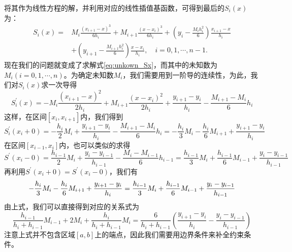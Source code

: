 	将其作为线性方程的解，并利用对应的线性插值基函数，可得到最后的$S_{i}(x)$为：
	\begin{equation}
		\begin{aligned}
			S_{i}(x)=& M_i \frac{\left(x_{i+1}-x\right)^3}{6 h_i}+M_{i+1} \frac{\left(x-x_i\right)^3}{6 h_i}+\left(y_i-\frac{M_i h_i^2}{6}\right) \frac{x_{i+1}-x}{h_i} \\
				 &+\left(y_{i+1}-\frac{M_{i+1} h_i^2}{6}\right) \frac{x-x_i}{h_i}, \quad i=0,1, \cdots, n-1 .
		\end{aligned}
		\label{eq:unkown_Sx}
	\end{equation} 
	现在我们的问题就变成了求解式\eqref{eq:unkown_Sx}，而其中的未知数为$M_i(i = 0, 1, \cdots, n)$。为确定未知数$M_i$，我们需要用到一阶导的连续性，为此，我们对$S_{i}(x)$求一次导得
	\begin{equation}
		S_{i}^{\prime}(x)=-M_i \frac{\left(x_{i+1}-x\right)^2}{2 h_i}+M_{i+1} \frac{\left(x-x_i\right)^2}{2 h_i}+\frac{y_{i+1}-y_i}{h_i}-\frac{M_{i+1}-M_i}{6} h_i	\label{eq:first_order_Sx}
	\end{equation}
	这样，在区间$[x_i, x_{i+1}]$内，我们得到
	\begin{equation*}
		S_{i}^{\prime}(x_i + 0) = - \frac{h_i}{2}M_i + \frac{y_{i+1} - y_i}{h_i} - \frac{M_{i+1} - M_{i}}{6}h_i = - \frac{h_i}{3}M_i - \frac{h_i}{6}M_{i+1} + \frac{y_{i+1} - y_i}{h_i}
	\end{equation*} 
	在区间$[x_{i-1}, x_i]$内，也可以类似的求得
	\begin{equation*}
		S^{\prime}(x_i - 0) = \frac{h_{i-1}}{2}M_{i} + \frac{y_{i} - y_{i-1}}{h_{i-1}} - \frac{M_{i} - M_{i-1}}{6}h_{i-1} = \frac{h_{i-1}}{3}M_i + \frac{h_{i-1}}{6}M_{i-1} + \frac{y_{i} - y_{i-1}}{h_{i-1}}
	\end{equation*} 
	再利用$S^{\prime}(x_i + 0) =S^{\prime}(x_i - 0)$，我们有
	\begin{equation*}
			- \frac{h_i}{3}M_i - \frac{h_i}{6}M_{i+1} + \frac{y_{i+1} - y_i}{h_i} = \frac{h_{i-1}}{3}M_i + \frac{h_{i-1}}{6}M_{i-1} + \frac{y_{i} - y_{i-1}}{h_{i-1}}	\\
	\end{equation*}
	由上式，我们可以直接得到对应的关系式为
	\begin{equation}
		\frac{h_{i-1}}{h_i + h_{i-1}}M_{i-1} + 2 M_i + \frac{h_{i}}{h_i + h_{i-1}}M_{i} = \frac{6}{h_i + h_{i - 1}}\left(\frac{y_{i+1} - y_i}{h_i} - \frac{y_i - y_{i - 1}}{h_{i - 1}} \right)	\label{eq:cubic_linear}
	\end{equation} 
	注意上式并不包含区域$[a, b]$上的端点，因此我们需要用边界条件来补全约束条件。
